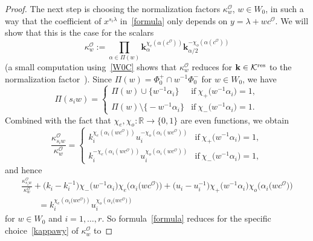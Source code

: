 \documentclass[11pt]{article}
\numberwithin{equation}{section}
\numberwithin{equation}{section}
\begin{document}
\begin{proof}
The next step is choosing the normalization factors $\kappa_w^\mathcal{O}$, $w\in W_0$, in such a way that the coefficient of $x^{s_i\lambda}$ in~\eqref{formula}
only depends on $y=\lambda+wc^\mathcal{O}$. We will show that this is the case for the scalars
\begin{equation}\label{kappawy}
\kappa_w^\mathcal{O}:=\prod_{\alpha\in\Pi(w)}\mathbf{k}_\alpha^{\chi_e(\alpha(c^\mathcal{O}))}\mathbf{k}_{\alpha/2}^{-\chi_o(\alpha(c^\mathcal{O}))}
\end{equation}
(a small computation using~\eqref{W0C} shows that $\kappa_w^\mathcal{O}$ reduces for $\mathbf{k}\in\mathcal{K}^{{\rm res}}$ to the normalization factor~\cite[(4.11)]{SSV2}).
Since $\Pi(w)=\Phi_0^+\cap w^{-1}\Phi_0^-$ for $w\in W_0$, we have
\begin{equation*}
\Pi(s_iw)=
\begin{cases}
\Pi(w)\cup\big\{w^{-1}\alpha_i\big\} &\text{if}\ \chi_+\bigl(w^{-1}\alpha_i\bigr)=1,\\
\Pi(w)\setminus\big\{-w^{-1}\alpha_i\big\} &\text{if} \
\chi_-\bigl(w^{-1}\alpha_i\bigr)=1.
\end{cases}
\end{equation*}
Combined with the fact that $\chi_e,\chi_o\colon \mathbb{R}\rightarrow\{0,1\}$ are even functions, we obtain
\begin{equation*}
\frac{\kappa_{s_iw}^\mathcal{O}}{\kappa_w^\mathcal{O}}=
\begin{cases}
k_i^{\chi_e(\alpha_i (wc^\mathcal{O}))}u_i^{-\chi_o(\alpha_i (wc^\mathcal{O} ))} &\text{if}\ \chi_+\bigl(w^{-1}\alpha_i\bigr)=1,\\
k_i^{-\chi_e(\alpha_i (wc^\mathcal{O}))}u_i^{\chi_o(\alpha_i (wc^\mathcal{O} ))} &\text{if}\ \chi_-\bigl(w^{-1}\alpha_i\bigr)=1,
\end{cases}
\end{equation*}
and hence
\begin{gather*}%
\frac{\kappa_{s_iw}^\mathcal{O}}{\kappa_w^\mathcal{O}}
+\bigl(k_i-k_i^{-1}\bigr)\chi_-\bigl(w^{-1}\alpha_i\bigr)\chi_e\bigl(\alpha_i\bigl(wc^\mathcal{O}\bigr)\bigr)+\bigl(u_i-u_i^{-1}\bigr)\chi_+\bigl(w^{-1}\alpha_i\bigr)\chi_o\bigl(\alpha_i\bigl(wc^\mathcal{O}\bigr)\bigr)\\
\qquad =k_i^{\chi_e(\alpha_i\bigl(wc^\mathcal{O}\bigr))}u_i^{\chi_o(\alpha_i\bigl(wc^\mathcal{O}\bigr))}
\end{gather*}
for $w\in W_0$ and $i=1,\dots,r$. So formula~\eqref{formula} reduces
for the specific choice~\eqref{kappawy} of $\kappa_w^\mathcal{O}$ to

\end{proof}
\end{document}
